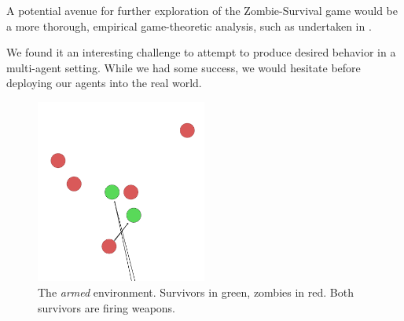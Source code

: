 \documentclass[11pt,a4paper]{article}
\begin{document}
A potential avenue for further exploration of the Zombie-Survival game
would be a more thorough, empirical game-theoretic analysis, such as undertaken in \citealp{10.5555/3091125.3091194}.

We found it an interesting challenge to attempt to produce desired behavior in a multi-agent setting.
While we had some success, we would hesitate before deploying our agents into the real world.

\begin{figure}
  \centering
  \includegraphics[width=0.5\textwidth]{figures/screencapture.png}
  \caption{
    The \emph{armed} environment.
    Survivors in green, zombies in red.
    Both survivors are firing weapons.
  }
  \label{fig:baseline_reward}
\end{figure}



\end{document}
